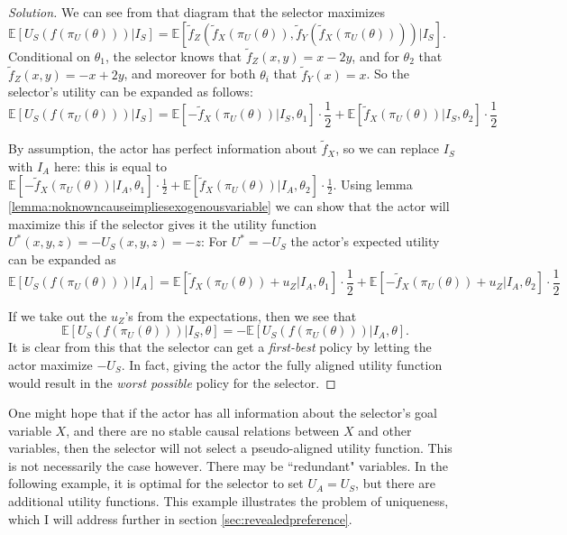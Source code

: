  \begin{proof}[Solution]
 	We can see from that diagram that the selector maximizes $\mathbb E[U_S(f(\pi_U(\theta)))|I_S]=\mathbb E[\tilde f_Z(\tilde f_X(\pi_U(\theta)), \tilde f_Y(\tilde f_X(\pi_U(\theta))))|I_S]$. Conditional on $\theta_1$, the selector knows that $\tilde f_Z(x,y)=x-2y$, and for $\theta_2$ that $\tilde f_Z(x,y)=-x+2y$, and moreover for both $\theta_i$ that $\tilde f_Y(x)=x$. So the selector's utility can be expanded as follows:
 	 \[\mathbb E[U_S(f(\pi_U(\theta)))|I_S]=
 	 \mathbb E [-\tilde f_X(\pi_U(\theta))|I_S,\theta_1]\cdot\frac 1 2+
 	 \mathbb E [\tilde f_X(\pi_U(\theta))|I_S,\theta_2]\cdot \frac 1 2\]
 	 
 	By assumption, the actor has perfect information about $\tilde f_X$, so we can replace $I_S$ with $I_A$ here: this is equal to $\mathbb E [-\tilde f_X(\pi_U(\theta))|I_A,\theta_1]\cdot\frac 1 2+
 	\mathbb E [\tilde f_X(\pi_U(\theta))|I_A,\theta_2]\cdot \frac 1 2$. Using lemma \ref{lemma:noknowncauseimpliesexogenousvariable} we can show that the actor will maximize this if the selector gives it the utility function $U^*(x,y,z)=-U_S(x,y,z)=-z$: For $U^*=-U_S$ the actor's expected utility can be expanded as 
 	\[\mathbb E[U_S(f(\pi_U(\theta)))|I_A]=
 	\mathbb E [\tilde f_X(\pi_U(\theta))+u_Z|I_A,\theta_1]\cdot\frac 1 2+
 	\mathbb E [-\tilde f_X(\pi_U(\theta))+u_Z|I_A,\theta_2]\cdot \frac 1 2\]
 	
 	If we take out the $u_Z$'s from the expectations, then we see that \[\mathbb E[U_S(f(\pi_U(\theta)))|I_S,\theta]=-\mathbb E[U_S(f(\pi_U(\theta)))|I_A,\theta].\] It is clear from this that the selector can get a \textit{first-best} policy by letting the actor maximize $-U_S$. In fact, giving the actor the fully aligned utility function would result in the \textit{worst possible} policy for the selector.
 \end{proof}

\bigskip
 
 
One might hope that if the actor has all information about the selector's goal variable $X$, and there are no stable causal relations between $X$ and other variables, then the selector will not select a pseudo-aligned utility function. This is not necessarily the case however. There may be ``redundant" variables. In the following example, it is optimal for the selector to set $U_A=U_S$, but there are additional utility functions. This example illustrates the problem of uniqueness, which I will address further in section \ref{sec:revealedpreference}.
 
